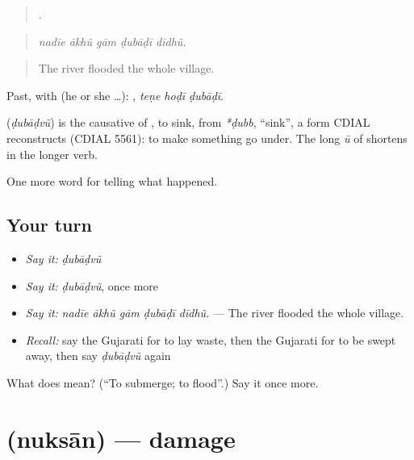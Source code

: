 \begin{quote}
    .
\end{quote}

\begin{quote}
\emph{nadīe ākhũ gām ḍubāḍī dīdhũ.}
\end{quote}

\begin{quote}
The river flooded the whole village.
\end{quote}

Past, with  (he or she …):   , \emph{teṇe hoḍī ḍubāḍī}.

\begin{cousinweb}
\textbf{} (\emph{ḍubāḍvũ}) is the causative of \textbf{}, to sink, from \emph{*ḍubb}, \textquotedblleft{}sink\textquotedblright{}, a form CDIAL reconstructs (CDIAL 5561): to make something go under. The long \emph{ū} of \textbf{} shortens in the longer verb.
\end{cousinweb}

\begin{grammarlens}[title={What you've built}]
One more word for telling what happened.
\end{grammarlens}

\subsection*{Your turn}
\begin{itemize}
\raggedright
  \item \emph{Say it:} \emph{ḍubāḍvũ}
  \item \emph{Say it:} \emph{ḍubāḍvũ}, once more
  \item \emph{Say it:} \emph{nadīe ākhũ gām ḍubāḍī dīdhũ.} — The river flooded the whole village.
  \item \emph{Recall:} say the Gujarati for to lay waste, then the Gujarati for to be swept away, then say \emph{ḍubāḍvũ} again
\end{itemize}

\begin{tcolorbox}[breakable,colback=teal!4,colframe=teal!35!black,title={Before you move on}]
What does  mean? (\textquotedblleft{}To submerge; to flood\textquotedblright{}.) Say it once more.
\end{tcolorbox}
\section[\texorpdfstring{\gu{નુકસાન} (nuksān)}{નુકસાન (nuksān)}]{ (nuksān) — damage}

